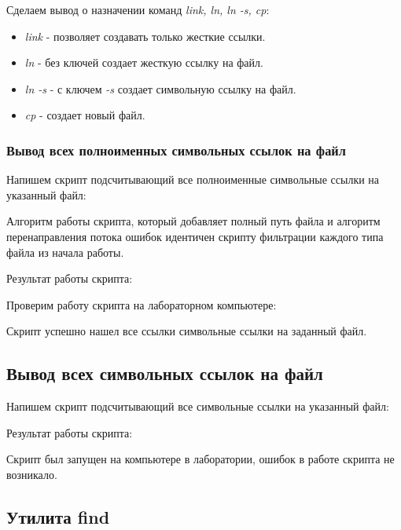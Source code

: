 \documentclass[14pt,a4paper,report]{report}
\begin{document}
Сделаем вывод о назначении команд \emph{link, ln, ln -s, cp}: 

\begin{itemize}
	\item \emph{link} - позволяет создавать только жесткие ссылки.
	\item \emph{ln} - без ключей создает жесткую ссылку на файл.
	\item \emph{ln -s} - с ключем \emph{-s} создает символьную ссылку на файл.
	\item \emph{cp} - создает новый файл.
\end{itemize}

\subsubsection{Вывод всех полноименных символьных ссылок на файл}

Напишем скрипт подсчитывающий все полноименные символьные ссылки на указанный файл:



Алгоритм работы скрипта, который добавляет полный путь файла и алгоритм перенаправления потока ошибок идентичен скрипту фильтрации каждого типа файла из начала работы.

Результат работы скрипта:



Проверим работу скрипта на лабораторном компьютере:



Скрипт успешно нашел все ссылки символьные ссылки на заданный файл.

\subsection{Вывод всех символьных ссылок на файл}

Напишем скрипт подсчитывающий все символьные ссылки на указанный файл:



Результат работы скрипта:



Скрипт был запущен на компьютере в лаборатории, ошибок в работе скрипта не возникало.

\subsection{Утилита find}
\end{document}
